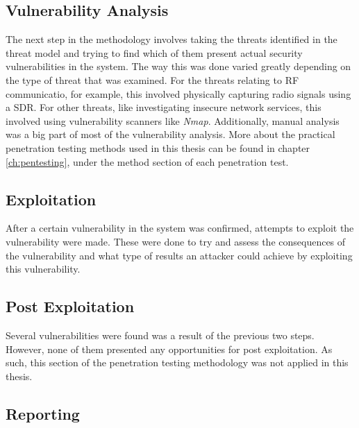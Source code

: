 \subsection{Vulnerability Analysis}
The next step in the methodology involves taking the threats identified in the threat model and trying to find which of them present actual security vulnerabilities in the system. The way this was done varied greatly depending on the type of threat that was examined. For the threats relating to \gls{RF} communicatio, for example, this involved physically capturing radio signals using a \gls{SDR}. For other threats, like investigating insecure network services, this involved using vulnerability scanners like \textit{Nmap}. Additionally, manual analysis was a big part of most of the vulnerability analysis. More about the practical penetration testing methods used in this thesis can be found in chapter \ref{ch:pentesting}, under the method section of each penetration test.

\subsection{Exploitation}
After a certain vulnerability in the system was confirmed, attempts to exploit the vulnerability were made. These were done to try and assess the consequences of the vulnerability and what type of results an attacker could achieve by exploiting this vulnerability.

\subsection{Post Exploitation}
Several vulnerabilities were found was a result of the previous two steps. However, none of them presented any opportunities for post exploitation. As such, this section of the penetration testing methodology was not applied in this thesis.

\subsection{Reporting}
\todo

